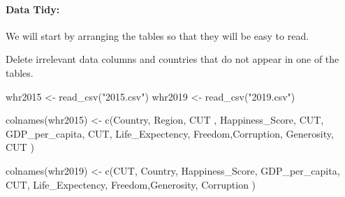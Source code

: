 \documentclass[
]{article}
\newenvironment{Shaded}{\begin{snugshade}}{\end{snugshade}}
\newcommand{\FunctionTok}[1]{\textcolor[rgb]{0.00,0.00,0.00}{#1}}
\newcommand{\NormalTok}[1]{#1}
\newcommand{\OtherTok}[1]{\textcolor[rgb]{0.56,0.35,0.01}{#1}}
\newcommand{\StringTok}[1]{\textcolor[rgb]{0.31,0.60,0.02}{#1}}
\begin{document}
\hfill\break

\hypertarget{data-tidy}{%
\paragraph{Data Tidy:}\label{data-tidy}}

We will start by arranging the tables so that they will be easy to read.

Delete irrelevant data columns and countries that do not appear in one
of the tables.

\begin{Shaded}
\begin{Highlighting}[]
\NormalTok{whr2015 }\OtherTok{\textless{}{-}} \FunctionTok{read\_csv}\NormalTok{(}\StringTok{"2015.csv"}\NormalTok{)}
\NormalTok{whr2019 }\OtherTok{\textless{}{-}} \FunctionTok{read\_csv}\NormalTok{(}\StringTok{"2019.csv"}\NormalTok{)}

\FunctionTok{colnames}\NormalTok{(whr2015) }\OtherTok{\textless{}{-}} \FunctionTok{c}\NormalTok{(}\StringTok{\textquotesingle{}Country\textquotesingle{}}\NormalTok{, }\StringTok{\textquotesingle{}Region\textquotesingle{}}\NormalTok{, }\StringTok{\textquotesingle{}CUT\textquotesingle{}}\NormalTok{ , }\StringTok{\textquotesingle{}Happiness\_Score\textquotesingle{}}\NormalTok{, }\StringTok{\textquotesingle{}CUT\textquotesingle{}}\NormalTok{, }\StringTok{\textquotesingle{}GDP\_per\_capita\textquotesingle{}}\NormalTok{, }\StringTok{\textquotesingle{}CUT\textquotesingle{}}\NormalTok{,}
                       \StringTok{\textquotesingle{}Life\_Expectency\textquotesingle{}}\NormalTok{, }\StringTok{\textquotesingle{}Freedom\textquotesingle{}}\NormalTok{,}\StringTok{\textquotesingle{}Corruption\textquotesingle{}}\NormalTok{, }\StringTok{\textquotesingle{}Generosity\textquotesingle{}}\NormalTok{, }\StringTok{\textquotesingle{}CUT\textquotesingle{}}\NormalTok{ )}

\FunctionTok{colnames}\NormalTok{(whr2019) }\OtherTok{\textless{}{-}} \FunctionTok{c}\NormalTok{(}\StringTok{\textquotesingle{}CUT\textquotesingle{}}\NormalTok{, }\StringTok{\textquotesingle{}Country\textquotesingle{}}\NormalTok{, }\StringTok{\textquotesingle{}Happiness\_Score\textquotesingle{}}\NormalTok{, }\StringTok{\textquotesingle{}GDP\_per\_capita\textquotesingle{}}\NormalTok{, }\StringTok{\textquotesingle{}CUT\textquotesingle{}}\NormalTok{, }\StringTok{\textquotesingle{}Life\_Expectency\textquotesingle{}}\NormalTok{,}
                       \StringTok{\textquotesingle{}Freedom\textquotesingle{}}\NormalTok{,}\StringTok{\textquotesingle{}Generosity\textquotesingle{}}\NormalTok{, }\StringTok{\textquotesingle{}Corruption\textquotesingle{}}\NormalTok{ )}


\end{Highlighting}
\end{Shaded}
\end{document}
